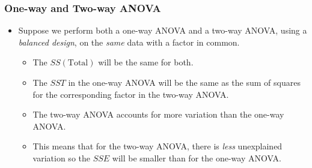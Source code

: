 \documentclass[12pt]{beamer}
\begin{document}
\begin{frame}
	\frametitle{One-way and Two-way ANOVA}
	
	\begin{itemize}[label={\color{blue}$\blacktriangleright$}]
		\item Suppose we perform both a one-way ANOVA and a two-way ANOVA, using a \emph{balanced design}, on the \emph{same} data with a factor in common.
		\begin{itemize}[label={\color{blue}$\blacktriangleright$}]
			\item The $SS(\text{Total})$ will be the same for both.
			\item The $SST$ in the one-way ANOVA will be the same as the sum of squares for the corresponding factor in the two-way ANOVA.
			\item The two-way ANOVA accounts for more variation than the one-way ANOVA.
			\item This means that for the two-way ANOVA, there is \emph{less} unexplained variation so the $SSE$ will be smaller than for the one-way ANOVA.
		\end{itemize}
	\end{itemize}
	
\end{frame}
\end{document}
